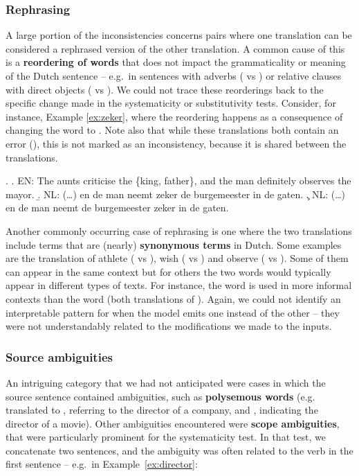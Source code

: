\subsubsection{Rephrasing}
A large portion of the inconsistencies concerns pairs where one translation can be considered a rephrased version of the other translation.
A common cause of this is a \textbf{reordering of words} that does not impact the grammaticality or meaning of the Dutch sentence -- e.g.\ in sentences with adverbs ( vs ) or relative clauses with direct objects ( vs ).
We could not trace these reorderings back to the specific change made in the systematicity or substitutivity tests.
Consider, for instance, Example \ref{ex:zeker}, where the reordering happens as a consequence of changing the word  to .
Note also that while these translations both contain an error (), this is not marked as an inconsistency, because it is shared between the translations.

\ex.\label{ex:zeker}
\a. \textsc{EN}: The aunts criticise the \{king, father\}, and the man definitely observes the mayor.
\b. \textsc{NL}: (\dots) en de man neemt zeker de burgemeester in de gaten.
\c. \textsc{NL}: (\dots) en de man neemt de burgemeester zeker in de gaten.


Another commonly occurring case of rephrasing is one where the two translations include terms that are (nearly) \textbf{synonymous terms} in Dutch.
Some examples are the translation of athlete ( vs ), wish ( vs ) and observe ( vs ).
Some of them can appear in the same context but for others the two words would typically appear in different types of texts.
For instance, the word  is used in more informal contexts than the word  (both translations of ).
Again, we could not identify an interpretable pattern for when the model emits one instead of the other -- they were not understandably related to the modifications we made to the inputs.

\subsubsection{Source ambiguities}
An intriguing category that we had not anticipated were cases in which the source sentence contained ambiguities, such as \textbf{polysemous words} %
(e.g.\  translated to , referring to the director of a company, and , indicating the director of a movie).
Other ambiguities encountered were \textbf{scope ambiguities}, that were particularly prominent for the systematicity test.
In that test, we concatenate two sentences, and the ambiguity was often related to the verb in the first sentence -- e.g.\ in Example~\ref{ex:director}: 

